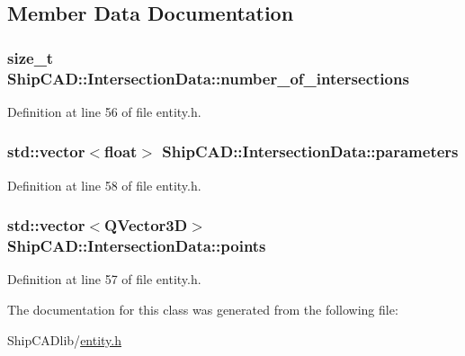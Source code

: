 \subsection{Member Data Documentation}
\hypertarget{classShipCAD_1_1IntersectionData_a5b42e3b8b81d18963f9a07609b402628}{
\subsubsection[{number\-\_\-of\-\_\-intersections}]{\setlength{\rightskip}{0pt plus 5cm}size\-\_\-t Ship\-C\-A\-D\-::\-Intersection\-Data\-::number\-\_\-of\-\_\-intersections}}\label{classShipCAD_1_1IntersectionData_a5b42e3b8b81d18963f9a07609b402628}


Definition at line 56 of file entity.\-h.

\hypertarget{classShipCAD_1_1IntersectionData_a06fcbb71243644bdea0e5b86da3b191c}{
\subsubsection[{parameters}]{\setlength{\rightskip}{0pt plus 5cm}std\-::vector$<$float$>$ Ship\-C\-A\-D\-::\-Intersection\-Data\-::parameters}}\label{classShipCAD_1_1IntersectionData_a06fcbb71243644bdea0e5b86da3b191c}


Definition at line 58 of file entity.\-h.

\hypertarget{classShipCAD_1_1IntersectionData_a926e126e42d95e01b39e2750a0e1fb95}{
\subsubsection[{points}]{\setlength{\rightskip}{0pt plus 5cm}std\-::vector$<$Q\-Vector3\-D$>$ Ship\-C\-A\-D\-::\-Intersection\-Data\-::points}}\label{classShipCAD_1_1IntersectionData_a926e126e42d95e01b39e2750a0e1fb95}


Definition at line 57 of file entity.\-h.



The documentation for this class was generated from the following file\-:\begin{DoxyCompactItemize}
\item 
Ship\-C\-A\-Dlib/\hyperlink{entity_8h}{entity.\-h}\end{DoxyCompactItemize}
